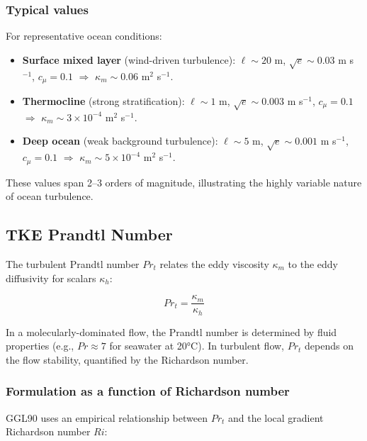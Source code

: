 \documentclass[12pt,letterpaper]{article}
\begin{document}
\subsubsection{Typical values}

For representative ocean conditions:
\begin{itemize}
\item \textbf{Surface mixed layer} (wind-driven turbulence): $\ell \sim 20$ m, $\sqrt{e} \sim 0.03$ m s$^{-1}$, $c_\mu = 0.1$ $\Rightarrow$ $\kappa_m \sim 0.06$ m$^2$ s$^{-1}$.
\item \textbf{Thermocline} (strong stratification): $\ell \sim 1$ m, $\sqrt{e} \sim 0.003$ m s$^{-1}$, $c_\mu = 0.1$ $\Rightarrow$ $\kappa_m \sim 3 \times 10^{-4}$ m$^2$ s$^{-1}$.
\item \textbf{Deep ocean} (weak background turbulence): $\ell \sim 5$ m, $\sqrt{e} \sim 0.001$ m s$^{-1}$, $c_\mu = 0.1$ $\Rightarrow$ $\kappa_m \sim 5 \times 10^{-4}$ m$^2$ s$^{-1}$.
\end{itemize}

These values span 2--3 orders of magnitude, illustrating the highly variable nature of ocean turbulence.

\subsection{TKE Prandtl Number}
\label{sec:tke_prandtl}

The turbulent Prandtl number $Pr_t$ relates the eddy viscosity $\kappa_m$ to the eddy diffusivity for scalars $\kappa_h$:

\begin{equation}
Pr_t = \frac{\kappa_m}{\kappa_h}
\label{eq:prandtl_def}
\end{equation}

In a molecularly-dominated flow, the Prandtl number is determined by fluid properties (e.g., $Pr \approx 7$ for seawater at 20°C). In turbulent flow, $Pr_t$ depends on the flow stability, quantified by the Richardson number.

\subsubsection{Formulation as a function of Richardson number}

GGL90 uses an empirical relationship between $Pr_t$ and the local gradient Richardson number $Ri$:
\end{document}
